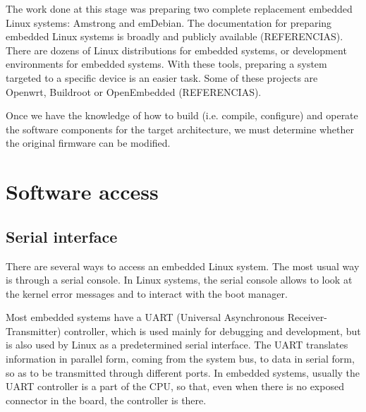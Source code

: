 \documentclass[conference]{IEEEtran}
\newcommand{\nota}[1]{}
\begin{document}
The work done at this stage was preparing two complete replacement embedded Linux systems: Amstrong and emDebian. The documentation for preparing embedded Linux systems is broadly and publicly available (REFERENCIAS). There are dozens of Linux distributions for embedded systems, or development environments for embedded systems. With these tools, preparing a system targeted to a specific device is an easier task. Some of these projects are Openwrt, Buildroot or OpenEmbedded (REFERENCIAS). 

Once we have the knowledge of how to build (i.e. compile, configure) and operate the software components for the target architecture, we must determine whether the original firmware can be modified.

\section{Software access}

\subsection{Serial interface}
\nota {
Existen varias posibilidades para conectarse a un dispositivo 
Linux embebido, pero una de las disponibles, mas comúnmente encontrada es
a través de una consola serial. En los sistemas Linux, la 
consola serial permite ver los mensajes de error del kernel,
y también interactuar con el gestor de arranque.
}

There are several ways to access an embedded Linux system. The most usual way is through a serial console. In Linux systems, the serial console allows to look at the kernel error messages and to interact with the boot manager.

\nota{ La mayoría de los sistemas embebidos contienen un controlador 
UART (del inglés ``Universal Asynchronous Receiver-Transmitter''),
utilizado principalmente para depuración y desarrollo.
Pero que también es utilizado por Linux como la interfaz serie
predeterminada.
El UART traduce la información en formato paralelo
provenientes del bus del sistema, a datos en formato serie,
para que puedan ser transmitidos a través de diferentes puertos.
En los sistemas embebidos, generalmente, el controlador UART es parte de la CPU,
por lo que, aunque no exista un conector expuesto en la placa, generalmente
está presente.
}

Most embedded systems have a UART (Universal Asynchronous Receiver-Transmitter) controller, which is used mainly for debugging and development, but is also used by Linux as a predetermined serial interface. The UART translates information in parallel form, coming from the system bus, to data in serial form, so as to be transmitted through different ports. In embedded systems, usually the UART controller is a part of the CPU, so that, even when there is no exposed connector in the board, the controller is there. 
\end{document}
